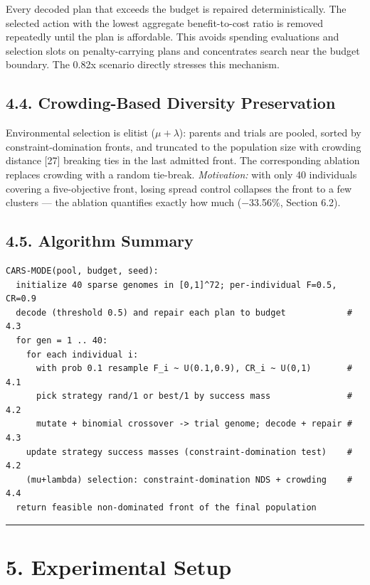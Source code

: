 \documentclass[
  10pt,
  a4paper,
]{article}
\begin{document}
Every decoded plan that exceeds the budget is repaired
deterministically. The selected action with the lowest aggregate
benefit-to-cost ratio is removed repeatedly until the plan is
affordable. This avoids spending evaluations and selection slots on
penalty-carrying plans and concentrates search near the budget boundary.
The 0.82x scenario directly stresses this mechanism.

\subsection{4.4. Crowding-Based Diversity
Preservation}\label{crowding-based-diversity-preservation}

Environmental selection is elitist (\(\mu + \lambda\)): parents and
trials are pooled, sorted by constraint-domination fronts, and truncated
to the population size with crowding distance {[}27{]} breaking ties in
the last admitted front. The corresponding ablation replaces crowding
with a random tie-break. \emph{Motivation:} with only 40 individuals
covering a five-objective front, losing spread control collapses the
front to a few clusters --- the ablation quantifies exactly how much
(−33.56\%, Section 6.2).

\subsection{4.5. Algorithm Summary}\label{algorithm-summary}

\begin{verbatim}
CARS-MODE(pool, budget, seed):
  initialize 40 sparse genomes in [0,1]^72; per-individual F=0.5, CR=0.9
  decode (threshold 0.5) and repair each plan to budget            # 4.3
  for gen = 1 .. 40:
    for each individual i:
      with prob 0.1 resample F_i ~ U(0.1,0.9), CR_i ~ U(0,1)       # 4.1
      pick strategy rand/1 or best/1 by success mass               # 4.2
      mutate + binomial crossover -> trial genome; decode + repair # 4.3
    update strategy success masses (constraint-domination test)    # 4.2
    (mu+lambda) selection: constraint-domination NDS + crowding    # 4.4
  return feasible non-dominated front of the final population
\end{verbatim}

\begin{center}\rule{0.5\linewidth}{0.5pt}\end{center}

\section{5. Experimental Setup}\label{experimental-setup}
\end{document}

